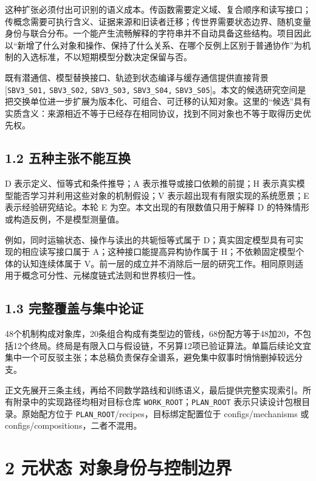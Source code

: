 \documentclass[
  10pt,
]{article}
\begin{document}
这种扩张必须付出可识别的语义成本。传函数需要定义域、复合顺序和读写接口；传概念需要可执行含义、证据来源和旧读者迁移；传世界需要状态边界、随机变量身份与联合分布。一个能产生流畅解释的字符串并不自动具备这些结构。项目因此以``新增了什么对象和操作、保持了什么关系、在哪个反例上区别于普通协作''为机制的入选标准，不以短期模型分数决定保留与否。

既有潜通信、模型替换接口、轨迹到状态编译与缓存通信提供直接背景
{[}\nolinkurl{SBV3_S01,} \nolinkurl{SBV3_S02,} \nolinkurl{SBV3_S03,}
\nolinkurl{SBV3_S04,}
\nolinkurl{SBV3_S05}{]}。本文的候选研究空间是把交换单位进一步扩展为版本化、可组合、可迁移的认知对象。这里的``候选''具有实质含义：来源相近不等于已经存在相同协议，找到不同对象也不等于取得历史优先权。

\subsection{1.2
五种主张不能互换}\label{ux4e94ux79cdux4e3bux5f20ux4e0dux80fdux4e92ux6362}

D 表示定义、恒等式和条件推导；A 表示推导或接口依赖的前提；H
表示真实模型能否学习并利用这些对象的机制假设；V
表示超出现有有限实现的系统愿景；E 表示经验研究结论。本轮 E
为空。本文出现的有限数值只用于解释 D
的特殊情形或构造反例，不是模型测量值。

例如，同时运输状态、操作与读出的共轭恒等式属于
D；真实固定模型具有可实现的相应读写接口属于
A；这种接口能提高异构协作属于 H；不依赖固定模型个体的认知连续体属于
V。前一层的成立并不消除后一层的研究工作。相同原则适用于概念可分性、元梯度链式法则和世界核归一性。

\subsection{1.3
完整覆盖与集中论证}\label{ux5b8cux6574ux8986ux76d6ux4e0eux96c6ux4e2dux8bbaux8bc1}

48个机制构成对象库，20条组合构成有类型边的管线，68份配方等于48加20，不包括12个终局。终局是有限入口与假设链，不另算12项已验证算法。单篇后续论文宜集中一个可反驳主张；本总稿负责保存全谱系，避免集中叙事时悄悄删掉较远分支。

正文先展开三条主线，再给不同数学路线和训练语义，最后提供完整实现索引。所有附录中的实现路径均相对目标仓库
\nolinkurl{WORK_ROOT}；\nolinkurl{PLAN_ROOT}
表示只读设计包根目录。原始配方位于
\nolinkurl{PLAN_ROOT}/recipes，目标绑定配置位于 configs/mechanisms 或
configs/compositions，二者不混用。

\section{2 元状态
对象身份与控制边界}\label{ux5143ux72b6ux6001-ux5bf9ux8c61ux8eabux4efdux4e0eux63a7ux5236ux8fb9ux754c}
\end{document}
